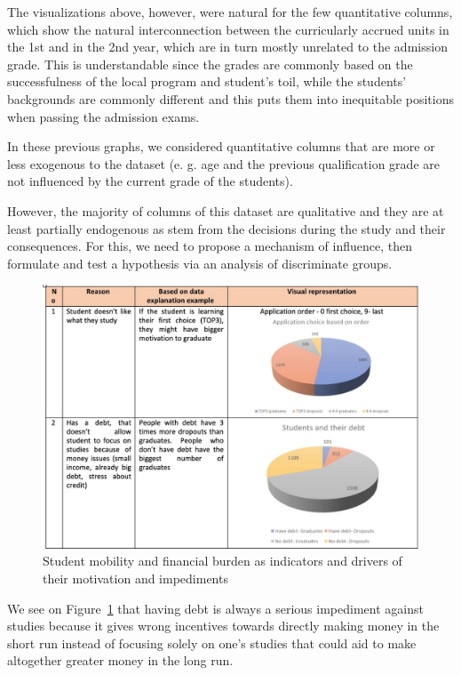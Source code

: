 \documentclass[
  letterpaper,
  DIV=11,
  numbers=noendperiod]{scrartcl}
\begin{document}
The visualizations above, however, were natural for the few quantitative
columns, which show the natural interconnection between the curricularly
accrued units in the 1st and in the 2nd year, which are in turn mostly
unrelated to the admission grade. This is understandable since the
grades are commonly based on the successfulness of the local program and
student's toil, while the students' backgrounds are commonly different
and this puts them into inequitable positions when passing the admission
exams.

In these previous graphs, we considered quantitative columns that are
more or less exogenous to the dataset (e. g. age and the previous
qualification grade are not influenced by the current grade of the
students).

However, the majority of columns of this dataset are qualitative and
they are at least partially endogenous as stem from the decisions during
the study and their consequences. For this, we need to propose a
mechanism of influence, then formulate and test a hypothesis via an
analysis of discriminate groups.

\begin{figure}

{\centering \includegraphics{./figs/reasons-1.jpg}

}

\caption{\label{fig-word-1}Student mobility and financial burden as
indicators and drivers of their motivation and impediments}

\end{figure}

We see on Figure~\ref{fig-word-1} that having debt is always a serious
impediment against studies because it gives wrong incentives towards
directly making money in the short run instead of focusing solely on
one's studies that could aid to make altogether greater money in the
long run.
\end{document}
